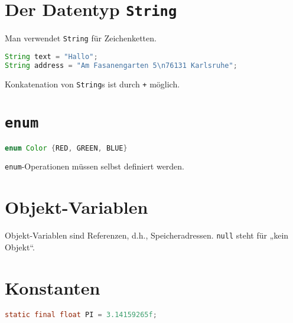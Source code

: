\section{Der Datentyp \texttt{String}}
Man verwendet \texttt{String} für Zeichenketten.
\begin{lstlisting}[language=Java]
String text = "Hallo";
String address = "Am Fasanengarten 5\n76131 Karlsruhe";
\end{lstlisting}
\begin{remark}
  Konkatenation von \texttt{String}s ist durch \texttt{+} möglich.
\end{remark}

\section{\texttt{enum}}
\begin{lstlisting}[language=Java]
enum Color {RED, GREEN, BLUE}
\end{lstlisting}
\begin{remark}
  \texttt{enum}-Operationen müssen selbst definiert werden.
\end{remark}

\section{Objekt-Variablen}
Objekt-Variablen sind Referenzen, d.h., Speicheradressen. \texttt{null} steht für „kein Objekt“.

\section{Konstanten}
\begin{lstlisting}[language=Java]
static final float PI = 3.14159265f;
\end{lstlisting}